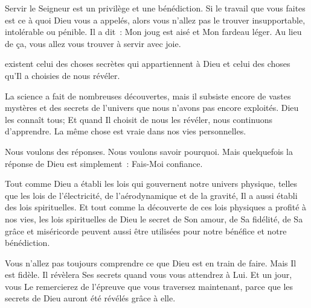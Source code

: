 Servir le Seigneur est un privilège et une bénédiction.
 Si le travail que vous faites est ce à quoi Dieu vous a appelés,
 alors vous n'allez pas le trouver insupportable, intolérable ou pénible.
 Il a dit~: \og Mon joug est aisé et Mon fardeau léger. \fg{}
 Au lieu de ça, vous allez vous trouver à servir avec joie. 

\dvrule






 existent \ocadr celui des choses secrètes
 qui appartiennent à Dieu et celui des choses qu'Il a choisies de nous révéler.

La science a fait de nombreuses découvertes, mais il subsiste encore
 de vastes mystères et des secrets de l'univers que nous n'avons
 pas encore exploités.
 Dieu les connaît tous; Et quand Il choisit de nous les révéler,
 nous continuons d'apprendre.
 La même chose est vraie dans nos vies personnelles.


Nous voulons des réponses. Nous voulons savoir pourquoi.
 Mais quelquefois la réponse de Dieu est simplement~:
 \og Fais-Moi confiance. \fg{}

Tout comme Dieu a établi les lois qui gouvernent notre univers physique,
 telles que les lois de l'électricité, de l'aérodynamique et de la gravité,
 Il a aussi établi des lois spirituelles.
 Et tout comme la découverte de ces lois physiques a profité à nos vies,
 les lois spirituelles de Dieu \ocadr le secret de Son amour, de Sa fidélité,
 de Sa grâce et miséricorde \fcadr{}
 peuvent aussi être utilisées pour notre bénéfice et notre bénédiction.

Vous n'allez pas toujours comprendre ce que Dieu est en train de faire.
 Mais Il est fidèle. Il révèlera Ses secrets quand vous vous attendrez à Lui.
 Et un jour, vous Le remercierez de l'épreuve que vous traversez maintenant,
 parce que les secrets de Dieu auront été révélés grâce à elle. 

